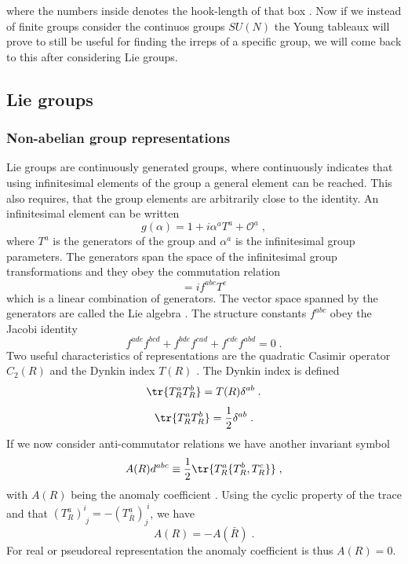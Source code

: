 where the numbers inside denotes the hook-length of that box \cite{https://arxiv.org/pdf/1112.0687}. 
Now if we instead of finite groups consider the continuos groups $SU(N)$ the Young tableaux will prove to still be useful for finding the irreps of a specific group, we will come back to this after considering Lie groups. 


\subsection{Lie groups}

\subsubsection{Non-abelian group representations}
Lie groups are continuously generated groups, where continuously indicates that using infinitesimal elements of the group a general element can be reached. This also requires, that the group elements are arbitrarily close to the identity. An infinitesimal element can be written 
\begin{equation}
    g(\alpha)=1+i\alpha^aT^a + \mathcal{O}^a\;,
\end{equation}
where $T^a$ is the generators of the group and $\alpha^a$ is the infinitesimal group parameters. The generators span the space of the infinitesimal group transformations and they obey the commutation relation
\begin{equation}
    [T^a,T^b]=if^{abc}T^c
\end{equation}
which is a linear combination of generators. The vector space spanned by the generators are called the Lie algebra \cite{Peskin:1995ev}. The structure constants $f^{abc}$ obey the Jacobi identity
\begin{equation}
    f^{ade}f^{bcd}+f^{bde}f^{cad}+f^{cde}f^{abd}=0\;.
\end{equation}
Two useful characteristics of representations are the quadratic Casimir operator $C_2(R)$ and the Dynkin index $T(R)$ \cite{srednicki2006qft}. The Dynkin index is defined 
\begin{equation}
    \tr{T^a_R T^b_R}=T(R)\delta^{ab}\;.
\end{equation}
\begin{equation}
    \tr{T^a_R T^b_R}=\frac{1}{2}\delta^{ab}\;.
    \label{eq: Dynkin index fund. rep}
\end{equation}
If we now consider anti-commutator relations we have another invariant symbol 
\begin{equation}
    A(R)d^{abc}\equiv \frac 12 \tr{T^a_R\{T^b_R,T^c_R\}}\;,
\end{equation}
with $A(R)$ being the anomaly coefficient \cite{srednicki2006qft}. Using the cyclic property of the trace and that $(T^a_R)^i_{\;j}=-(T^a_{\bar R})_j^{\;i}$, we have
\begin{equation}
    A(R)=-A(\bar R)\;.
    \label{eq:anomaly coefficient}
\end{equation}
For real or pseudoreal representation the anomaly coefficient is thus $A(R)=0$. 
